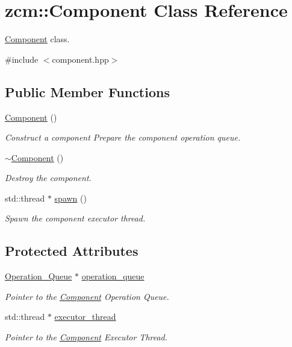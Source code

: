 \hypertarget{classzcm_1_1Component}{}\section{zcm\+:\+:Component Class Reference}
\label{classzcm_1_1Component}


\hyperlink{classzcm_1_1Component}{Component} class.  




{\ttfamily \#include $<$component.\+hpp$>$}

\subsection*{Public Member Functions}
\begin{DoxyCompactItemize}
\item 
\hyperlink{classzcm_1_1Component_a6fd6b1f309a6b464a14c22a94d18f040}{Component} ()
\begin{DoxyCompactList}\small\item\em Construct a component Prepare the component operation queue. \end{DoxyCompactList}\item 
\hyperlink{classzcm_1_1Component_a0bab6bb89e49affa281179f5d6aeff6a}{$\sim$\+Component} ()
\begin{DoxyCompactList}\small\item\em Destroy the component. \end{DoxyCompactList}\item 
std\+::thread $\ast$ \hyperlink{classzcm_1_1Component_a328d6f79aab5455e96a2badfdb6bb451}{spawn} ()
\begin{DoxyCompactList}\small\item\em Spawn the component executor thread. \end{DoxyCompactList}\end{DoxyCompactItemize}
\subsection*{Protected Attributes}
\begin{DoxyCompactItemize}
\item 
\hyperlink{classzcm_1_1Operation__Queue}{Operation\+\_\+\+Queue} $\ast$ \hyperlink{classzcm_1_1Component_a4c9f3591c18dde89bc3c2af7717c6692}{operation\+\_\+queue}
\begin{DoxyCompactList}\small\item\em Pointer to the \hyperlink{classzcm_1_1Component}{Component} Operation Queue. \end{DoxyCompactList}\item 
std\+::thread $\ast$ \hyperlink{classzcm_1_1Component_a392ca3b6cd537cd7aa1d4db31dacdf4d}{executor\+\_\+thread}
\begin{DoxyCompactList}\small\item\em Pointer to the \hyperlink{classzcm_1_1Component}{Component} Executor Thread. \end{DoxyCompactList}\end{DoxyCompactItemize}


